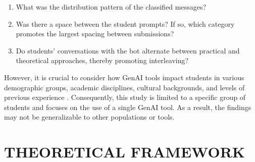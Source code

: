 \documentclass[a4paper,twoside]{article}
\begin{document}
\begin{enumerate}
  \item What was the distribution pattern of the classified messages?
  \item Was there a space between the student prompts? If so, which category promotes the largest spacing between submissions?
  \item Do students' conversations with the bot alternate between practical and theoretical approaches, thereby promoting interleaving?
\end{enumerate}


However, it is crucial to consider how GenAI tools impact students in
various demographic groups, academic disciplines, cultural backgrounds, and
levels of previous experience \citep{catalan21} \citep{neo22}. Consequently, this
study is limited to a specific group of students and focuses on the use of a
single GenAI tool. As a result, the findings may not be generalizable to other
populations or tools.




\section{\uppercase{Theoretical Framework}}
\end{document}
